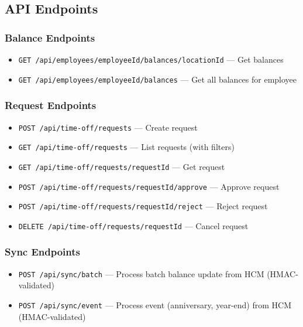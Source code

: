 \documentclass[12pt,a4paper]{article}
\begin{document}
\subsection{API Endpoints}

\subsubsection{Balance Endpoints}

\begin{itemize}
    \item \texttt{GET /api/employees/{employeeId}/balances/{locationId}} — Get balances
    \item \texttt{GET /api/employees/{employeeId}/balances} — Get all balances for employee
\end{itemize}

\subsubsection{Request Endpoints}

\begin{itemize}
    \item \texttt{POST /api/time-off/requests} — Create request
    \item \texttt{GET /api/time-off/requests} — List requests (with filters)
    \item \texttt{GET /api/time-off/requests/{requestId}} — Get request
    \item \texttt{POST /api/time-off/requests/{requestId}/approve} — Approve request
    \item \texttt{POST /api/time-off/requests/{requestId}/reject} — Reject request
    \item \texttt{DELETE /api/time-off/requests/{requestId}} — Cancel request
\end{itemize}

\subsubsection{Sync Endpoints}

\begin{itemize}
    \item \texttt{POST /api/sync/batch} — Process batch balance update from HCM (HMAC-validated)
    \item \texttt{POST /api/sync/event} — Process event (anniversary, year-end) from HCM (HMAC-validated)
\end{itemize}
\end{document}
